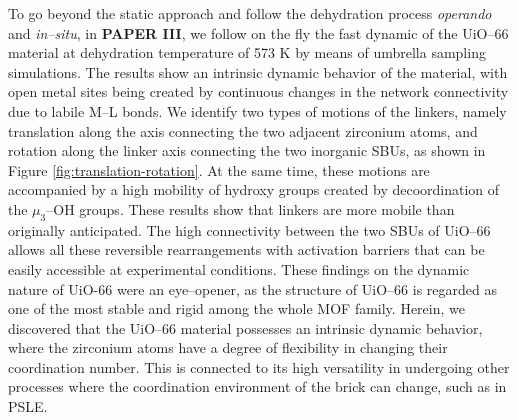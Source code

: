\npar
To go beyond the static approach and follow the dehydration process \textit{operando} and \textit{in--situ}, in \textbf{PAPER III}, we follow on the fly the fast dynamic of the UiO--66 material at dehydration temperature of 573 K by means of umbrella sampling simulations. The results show an intrinsic dynamic behavior of the material, with open metal sites being created by continuous changes in the network connectivity due to labile M--L bonds. We identify two types of motions of the linkers, namely translation along the axis connecting the two adjacent zirconium atoms, and rotation along the linker axis connecting the two inorganic SBUs, as shown in Figure \ref{fig:translation-rotation}. At the same time, these motions are accompanied by a high mobility of hydroxy groups created by decoordination of the $\mu_3$--OH groups. These results show that linkers are more mobile than originally anticipated. The high connectivity between the two SBUs of UiO--66 allows all these reversible rearrangements with activation barriers that can be easily accessible at experimental conditions. 
\npar
These findings on the dynamic nature of UiO-66 were an eye--opener, as the structure of UiO--66 is regarded as one of the most stable and rigid among the whole MOF family. Herein, we discovered that the UiO--66 material possesses an intrinsic dynamic behavior, where the zirconium atoms have a degree of flexibility in changing their coordination number. This is connected to its high versatility in undergoing other processes where the coordination environment of the brick can change, such as in PSLE.


